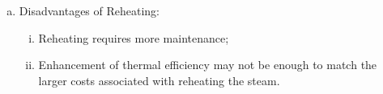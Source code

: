 \documentclass[10pt,compress,handout,ignorenonframetext]{beamer}
\begin{document}
\begin{frame}
\begin{columns}
\begin{column}[c]{0.5\linewidth}
{\begin{figure}
\begin{center}
           \end{center}
        \end{figure}} 
        \begin{enumerate}[(a)]\scriptsize\setcounter{enumi}{5}
           \item<5-> Disadvantages of Reheating:
              \begin{enumerate}[(i)]\scriptsize
                 \item<5->Reheating requires more maintenance;
                 \item<5->Enhancement of thermal efficiency may not be enough to match the larger costs associated with reheating the steam.
              \end{enumerate}
        \end{enumerate}
     \end{column}
  \end{columns}
 \normalsize
\end{frame}
\end{document}
